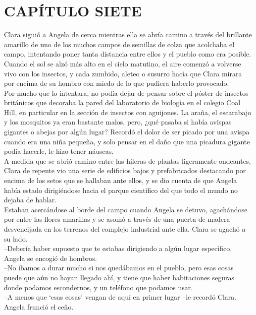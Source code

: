 \chapter*{CAPÍTULO SIETE}
Clara siguió a Angela de cerca mientras ella se abría camino a través
del brillante amarillo de uno de los muchos campos de semillas de colza
que acolchaba el campo, intentando poner tanta distancia entre ellos y
el pueblo como era posible.\\
Cuando el sol se alzó más alto en el cielo matutino, el aire comenzó a
volverse vivo con los insectos, y cada zumbido, aleteo o susurro hacía
que Clara mirara por encima de su hombro con miedo de lo que pudiera
haberlo provocado.\\
Por mucho que lo intentara, no podía dejar de pensar sobre el póster de
insectos británicos que decoraba la pared del laboratorio de biología en
el colegio Coal Hill, en particular en la sección de insectos con
aguijones. La araña, el escarabajo y los mosquitos ya eran bastante
malos, pero, ¿qué pasaba si había avispas gigantes o abejas por algún
lugar? Recordó el dolor de ser picado por una avispa cuando era una niña
pequeña, y solo pensar en el daño que una picadura gigante podía
hacerle, le hizo tener náuseas.\\
A medida que se abrió camino entre las hileras de plantas ligeramente
ondeantes, Clara de repente vio una serie de edificios bajos y
prefabricados destacando por encima de los setos que se hallaban ante
ellos, y se dio cuenta de que Angela había estado dirigiéndose hacia el
parque científico del que todo el mundo no dejaba de hablar.\\
Estaban acercándose al borde del campo cuando Angela se detuvo,
agachándose por entre las flores amarillas y se asomó a través de una
puerta de madera desvencijada en los terrenos del complejo industrial
ante ella. Clara se agachó a su lado.\\
--Debería haber supuesto que te estabas dirigiendo a algún lugar
específico.\\
Angela se encogió de hombros.\\
--No íbamos a durar mucho si nos quedábamos en el pueblo, pero esas
cosas puede que aún no hayan llegado ahí, y tiene que haber habitaciones
seguras donde podamos escondernos, y un teléfono que podamos usar.\\
--A menos que `esas cosas' vengan de aquí en primer lugar --le recordó
Clara.\\
Angela frunció el ceño.\\
